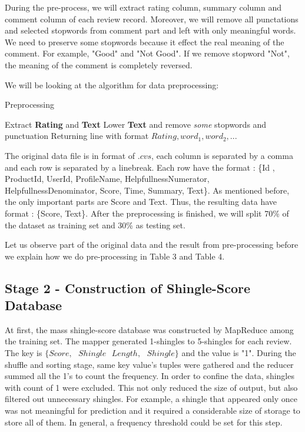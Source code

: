 During the pre-process, we will extract rating column, summary column and comment column of each review record. Moreover, we will remove all punctations and selected stopwords from comment part and left with only meaningful words. We need to preserve some stopwords because it effect the real meaning of the comment. For example, "Good" and "Not Good". If we remove stopword "Not", the meaning of the comment is completely reversed.

We will be looking at the algorithm for data preprocessing: 
\begin{algorithm}
\caption{Preprocessing}
 {
 	Extract \textbf{Rating} and \textbf{Text}\;
 	Lower \textbf{Text} and remove \emph{some} stopwords and punctuation\;
 	Returning line with format \(Rating, word_{1}, word_{2}, ...\)\;
 }
\end{algorithm}



The original data file is in format of \(.cvs\), each column is separated by a comma and each row is separated by a linebreak. Each row have the format : \{Id , ProductId, UserId, ProfileName, HelpfullnessNumerator, HelpfullnessDenominator, Score, Time, Summary, Text\}. As mentioned before, the only important parts are Score and Text. Thus, the resulting data have format : \{Score, Text\}. After the preprocessing is finished, we will split 70\% of the dataset as training set and 30\% as testing set.

Let us observe part of the original data and the result from pre-processing before we explain how we do pre-processing in Table 3 and Table 4.




\subsection{Stage 2 - Construction of Shingle-Score Database}
At first, the mass shingle-score database was constructed by MapReduce among the training set. The mapper generated 1-shingles to 5-shingles for each review. The key is \(\{Score,\mbox{ } Shingle\mbox{ } Length,\mbox{ } Shingle\}\) and the value is "1". During the shuffle and sorting stage, same key value's tuples were gathered and the reducer summed all the 1's to count the frequency. In order to confine the data, shingles with count of 1 were excluded.
This not only reduced the size of output, but also filtered out unnecessary shingles. For example, a shingle that appeared only once was not meaningful for prediction and it required a considerable size of storage to store all of them.
In general, a frequency threshold could be set for this step.

